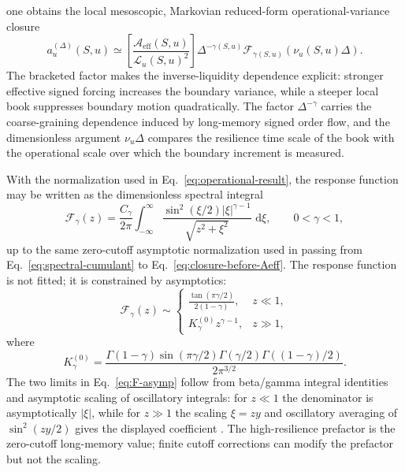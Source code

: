 \documentclass[11pt]{amsart}
\newcommand{\dd}{\,\mathrm{d}}
\newcommand{\cL}{\mathcal{L}}
\newcommand{\Aeff}{\mathcal{A}_{\mathrm{eff}}}
\newcommand{\Fcal}{\mathcal{F}}
\theoremstyle{definition}
\theoremstyle{plain}
\theoremstyle{remark}
\begin{document}
one obtains the local mesoscopic, Markovian reduced-form operational-variance closure
\begin{equation}
 a_u^{(\Delta)}(S,u)
 \simeq
 \left[\frac{\Aeff(S,u)}{\cL_u(S,u)^2}\right]
 \Delta^{-\gamma(S,u)}
 \Fcal_{\gamma(S,u)}(\nu_u(S,u)\Delta).
 \label{eq:operational-result}
\end{equation}
The bracketed factor makes the inverse-liquidity dependence explicit: stronger effective signed forcing increases the boundary variance, while a steeper local book suppresses boundary motion quadratically. The factor $\Delta^{-\gamma}$ carries the coarse-graining dependence induced by long-memory signed order flow, and the dimensionless argument $\nu_u\Delta$ compares the resilience time scale of the book with the operational scale over which the boundary increment is measured.

With the normalization used in Eq.~\eqref{eq:operational-result}, the response function may be written as the dimensionless spectral integral
\begin{equation}
 \Fcal_\gamma(z)=
 \frac{C_\gamma}{2\pi}
 \int_{-\infty}^{\infty}
 \frac{\sin^2(\xi/2)|\xi|^{\gamma-1}}
 {\sqrt{z^2+\xi^2}}\,\dd\xi,
 \qquad 0<\gamma<1,
 \label{eq:F-definition}
\end{equation}
up to the same zero-cutoff asymptotic normalization used in passing from Eq.~\eqref{eq:spectral-cumulant} to Eq.~\eqref{eq:closure-before-Aeff}. The response function is not fitted; it is constrained by asymptotics:
\begin{equation}
 \Fcal_\gamma(z)\sim
 \begin{cases}
 \displaystyle \frac{\tan(\pi\gamma/2)}{2(1-\gamma)},& z\ll1,\\[1.2em]
 \displaystyle K_\gamma^{(0)}z^{\gamma-1},& z\gg1,
 \end{cases}
 \label{eq:F-asymp}
\end{equation}
where
\begin{equation}
 K_\gamma^{(0)}=\frac{\Gamma(1-\gamma)\sin(\pi\gamma/2)\Gamma(\gamma/2)\Gamma((1-\gamma)/2)}{2\pi^{3/2}}.
 \label{eq:Kgamma}
\end{equation}
The two limits in Eq.~\eqref{eq:F-asymp} follow from beta/gamma integral identities and asymptotic scaling of oscillatory integrals: for \(z\ll1\) the denominator is asymptotically \(|\xi|\), while for
\(z\gg1\) the scaling \(\xi=zy\) and oscillatory averaging of
\(\sin^2(zy/2)\) gives the displayed coefficient
\cite{GradshteynRyzhik,Wong2001}. The high-resilience prefactor is the zero-cutoff long-memory value; finite cutoff corrections can modify the prefactor but not the scaling.
\end{document}
